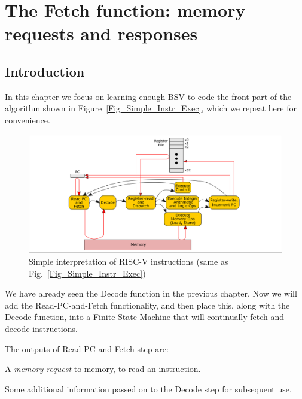 

\chapter{The Fetch function: memory requests and responses}


\setcounter{page}{1}
\renewcommand{\thepage}{\arabic{chapter}-\arabic{page}}

\label{ch_FSM_Fetch}


\section{Introduction}

In this chapter we focus on learning enough BSV to code the front part
of the algorithm shown in Figure~\ref{Fig_Simple_Instr_Exec}, which we
repeat here for convenience.
\begin{figure}[htbp]
  \centerline{\includegraphics[width=6in,angle=0]{ch030_RISCV_Design_Space/Figures/Fig_Simple_Instr_Exec}}
  \caption{\label{Fig_FSM_Fetch_Simple_Instr_Exec}Simple interpretation of RISC-V instructions (same as Fig.~\ref{Fig_Simple_Instr_Exec})}
\end{figure}
We have
already seen the Decode function in the previous chapter.  Now we will
add the Read-PC-and-Fetch functionality, and then place this, along
with the Decode function, into a Finite State Machine that will
continually fetch and decode instructions.

The outputs of Read-PC-and-Fetch step are:
\begin{tightlist}

 \item A \emph{memory request} to memory, to read an instruction.

 \item Some additional information passed on to the Decode step for subsequent use.

\end{tightlist}

